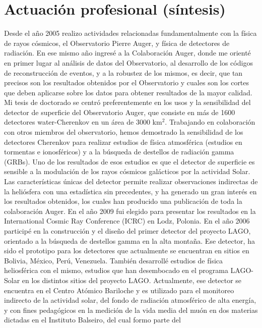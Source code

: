 \documentclass[11pt, a4paper]{article}
\begin{document}
\section*{Actuación profesional (síntesis)}

Desde el año 2005 realizo actividades relacionadas fundamentalmente con la
física de rayos cósmicos, el Observatorio Pierre Auger, y física de detectores
de radiación. En ese mismo año ingresé a la Colaboración Auger, donde me
orienté en primer lugar al análisis de datos del Observatorio, al desarrollo de
los códigos de reconstrucción de eventos, y a la robustez de los mismos, es
decir, que tan precisos son los resultados obtenidos por el Observatorio y
cuales son los cortes que deben aplicarse sobre los datos para obtener
resultados de la mayor calidad.  Mi tesis de doctorado se centró
preferentemente en los usos y la sensibilidad del detector de superficie del
Observatorio Auger, que consiste en más de 1600 detectores water-Cherenkov en
un área de 3000 km$^2$. Trabajando en colaboración con otros miembros del
observatorio, hemos demostrado la sensibilidad de los detectores Cherenkov para
realizar estudios de física atmosférica (estudios en tormentas e ionosféricos)
y a la búsqueda de destellos de radiación gamma (GRBs).  Uno de los resultados
de esos estudios es que el detector de superficie es sensible a la modulación
de los rayos cósmicos galácticos por la actividad Solar. Las características
únicas del detector permite realizar observaciones indirectas de la heliósfera
con una estadística sin precedentes, y ha generado un gran interés en los
resultados obtenidos, los cuales han producido una publicación de toda la
colaboración Auger. En el año 2009 fui elegido para presentar los resultados en
la International Cosmic Ray Conference (ICRC) en Lodz, Polonia.  En el año 2006
participé en la construcción y el diseño del primer detector del proyecto LAGO,
orientado a la búsqueda de destellos gamma en la alta montaña.  Ese detector,
ha sido el prototipo para los detectores que actualmente se encuentran en
sitios en Bolivia, México, Perú, Venezuela.  También desarrollé estudios de
física heliosférica con el mismo, estudios que han desembocado en el programa
LAGO-Solar en los distintos sitios del proyecto LAGO. Actualmente, ese detector
se encuentra en el Centro Atómico Bariloche y es utilizado para el monitoreo
indirecto de la actividad solar, del fondo de radiación atmosférico de alta
energía, y con fines pedagógicos en la medición de la vida media del muón en
dos materias dictadas en el Instituto Balseiro, del cual formo parte del
\end{document}
